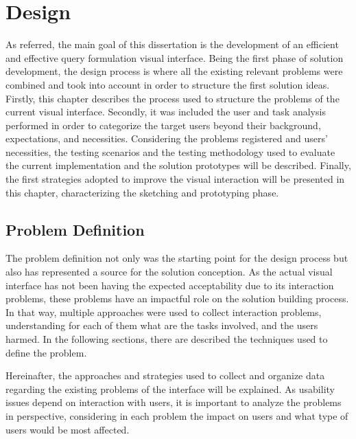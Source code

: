 \chapter{Design}
\label{cha:design}

As referred, the main goal of this dissertation is the development of an efficient and effective query formulation visual interface. Being the first phase of solution development, the design process is where all the existing relevant problems were combined and took into account in order to structure the first solution ideas. Firstly, this chapter describes the process used to structure the problems of the current visual interface. Secondly, it was included the user and task analysis performed in order to categorize the target users beyond their background, expectations, and necessities. Considering the problems registered and users' necessities, the testing scenarios and the testing methodology used to evaluate the current implementation and the solution prototypes will be described. Finally, the first strategies adopted to improve the visual interaction will be presented in this chapter, characterizing the sketching and prototyping phase.

\section{Problem Definition}
\label{sec:problem_definition}

The problem definition not only was the starting point for the design process but also has represented a source for the solution conception. As the actual visual interface has not been having the expected acceptability due to its interaction problems, these problems have an impactful role on the solution building process. In that way, multiple approaches were used to collect interaction problems, understanding for each of them what are the tasks involved, and the users harmed. In the following sections, there are described the techniques used to define the problem.


Hereinafter, the approaches and strategies used to collect and organize data regarding the existing problems of the interface will be explained. As usability issues depend on interaction with users, it is important to analyze the problems in perspective, considering in each problem the impact on users and what type of users would be most affected.

